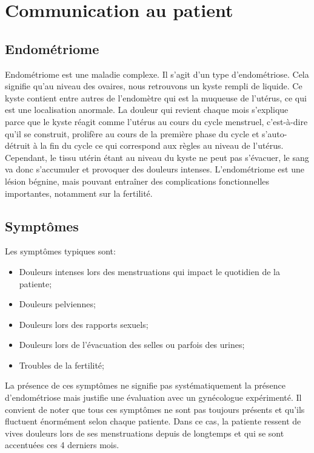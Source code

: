 \section{Communication au patient}

\subsection{Endométriome}
Endométriome est une maladie complexe. Il s’agit d’un type d’endométriose. Cela signifie qu’au niveau des ovaires, nous retrouvons un kyste rempli de liquide. Ce kyste contient entre autres de l’endomètre qui est la muqueuse de l’utérus, ce qui est une localisation anormale. La douleur qui revient chaque mois s’explique parce que le kyste réagit comme l’utérus au cours du cycle menstruel, c’est-à-dire qu’il se construit, prolifère au cours de la première phase du cycle et s’auto-détruit à la fin du cycle ce qui correspond aux règles au niveau de l’utérus. Cependant, le tissu utérin étant au niveau du kyste ne peut pas s’évacuer, le sang va donc s’accumuler et provoquer des douleurs intenses. L’endométriome est une lésion bégnine, mais pouvant entraîner des complications fonctionnelles importantes, notamment sur la fertilité.

\subsection{Symptômes}

Les symptômes typiques sont:

\begin{itemize}[label=\textbullet]
    \item Douleurs intenses lors des menstruations qui impact le quotidien de la patiente;
    \item Douleurs pelviennes;
    \item Douleurs lors des rapports sexuels;
    \item Douleurs lors de l’évacuation des selles ou parfois des urines;
    \item Troubles de la fertilité;
\end{itemize}

La présence de ces symptômes ne signifie pas systématiquement la présence d’endométriose mais justifie une évaluation avec un gynécologue expérimenté. Il convient de noter que tous ces symptômes ne sont pas toujours présents et qu’ils fluctuent énormément selon chaque patiente. Dans ce cas, la patiente ressent de vives douleurs lors de ses menstruations depuis de longtemps et qui se sont accentuées ces 4 derniers mois.

